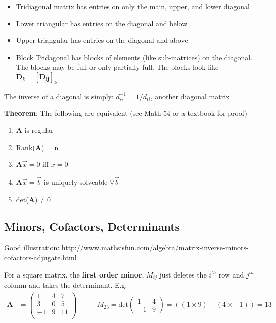 \documentclass[12pt]{article}
\newcommand{\ve}[1]{\ensuremath{\mathbf{#1}}}
\begin{document}
\begin{itemize}
\item Tridiagonal matrix has entries on only the main, upper, and lower diagonal
\item Lower triangular has entries on the diagonal and below
\item Upper triangular has entries on the diagonal and above 
\item Block Tridagonal has blocks of elements (like sub-matrices) on the diagonal. The blocks may be full or only partially full. The blocks look like $\ve{D}_k = [\ve{D_{ij}}]_k$
\end{itemize}

The inverse of a diagonal is simply: $d_{ii}^{-1} = 1/d_{ii}$, another diagonal matrix

\textbf{Theorem}: The following are equivalent (see Math 54 or a textbook for proof)
%
\begin{enumerate}
\item $\ve{A}$ is regular
\item Rank($\ve{A}$) = n
\item $\ve{A}\vec{x} = 0$ iff $x=0$
\item $\ve{A}\vec{x} = \vec{b}$ is uniquely solveable $\forall \vec{b}$
\item det($\ve{A}) \neq 0$
\end{enumerate}


\subsection{Minors, Cofactors, Determinants}

Good illustration: http://www.mathsisfun.com/algebra/matrix-inverse-minors-cofactors-adjugate.html


For a square matrix, the \textbf{first order minor}, $M_{ij}$ just deletes the $i^{th}$ row and $j^{th}$ column and takes the determinant. E.g.
%
\begin{align}
    \ve{A} &= \begin{pmatrix}
        1 & 4 & 7 \\
        3 & 0 & 5 \\
        -1 & 9 & 11 \\
    \end{pmatrix} 
    \qquad
    &M_{23} = \text{det}\begin{pmatrix}
       1 & 4 \\
       -1 & 9 
    \end{pmatrix}   
    = ((1 \times 9) - (4 \times -1)) = 13 \nonumber
\end{align} 
\end{document}
